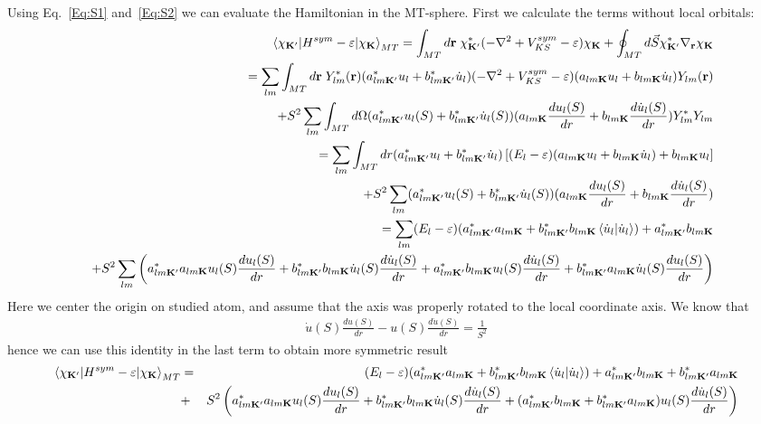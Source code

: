 \documentclass[aps,prb,floatfix,epsfig,singlecolumn,showpacs,preprintnumbers]{revtex4}
\renewcommand{\vr}{{\mathbf{r}}}
\newcommand{\vK}{{\mathbf{K}}}
\begin{document}
Using Eq.~\ref{Eq:S1} and~\ref{Eq:S2} we can evaluate the Hamiltonian
in the MT-sphere. First we calculate the terms without local orbitals:
\begin{eqnarray}
&&\braket{\chi_{\vK'}|H^{sym}-\varepsilon|\chi_\vK}_{MT}=\int_{MT}d\vr\; \chi^*_{\vK'}(-\nabla^2+V_{KS}^{sym}-\varepsilon)\chi_{\vK}+\oint_{MT} d\vec{S}
\chi^*_{\vK'}\nabla_\vr\chi_{\vK}\\
&&=
\sum_{lm}\int_{MT}d\vr\; Y_{lm}^*(\vr) (a_{lm\vK'}^* u_l+b_{lm\vK'}^* \dot{u}_l)
(-\nabla^2+V_{KS}^{sym}-\varepsilon)  (a_{lm\vK} u_l+b_{lm\vK} \dot{u}_l)Y_{lm}(\vr)
\nonumber\\
&&+S^2\sum_{lm}\int_{MT} d\Omega (a_{lm\vK'}^* u_l(S)+b_{lm\vK'}^*  \dot{u}_l(S))  (a_{lm\vK} \frac{d u_l(S)}{dr}+b_{lm\vK}  \frac{d\dot{u}_l(S)}{dr}) Y_{lm}^*  Y_{lm}
\nonumber\\
&&=
\sum_{lm}\int_{MT} dr (a_{lm\vK'}^* u_l+b_{lm\vK'}^* \dot{u}_l)  \left[(E_l-\varepsilon)(a_{lm\vK} u_l+b_{lm\vK} \dot{u}_l) +b_{lm\vK}  u_l \right]
\nonumber\\
&&+S^2\sum_{lm} (a_{lm\vK'}^* u_l(S)+b_{lm\vK'}^*  \dot{u}_l(S))  (a_{lm\vK} \frac{d u_l(S)}{dr}+b_{lm\vK}  \frac{d\dot{u}_l(S)}{dr})
\nonumber\\
&&=\sum_{lm}(E_l-\varepsilon) (a_{lm\vK'}^* a_{lm\vK} +b_{lm\vK'}^* b_{lm\vK}  \braket{\dot{u}_l|\dot{u}_l})+a_{lm\vK'}^* b_{lm\vK} 
\\
&&+S^2 \sum_{lm}\left(
a_{lm\vK'}^*a_{lm\vK} u_l(S) \frac{d u_l(S)}{dr}+
b_{lm\vK'}^* b_{lm\vK}  \dot{u}_l(S) \frac{d\dot{u}_l(S)}{dr}+
a_{lm\vK'}^* b_{lm\vK}  u_l(S) \frac{d\dot{u}_l(S)}{dr}+
b_{lm\vK'}^*  a_{lm\vK} \dot{u}_l(S) \frac{d u_l(S)}{dr}\right)\nonumber
\end{eqnarray}
Here we center the origin on studied atom, and assume that the axis
was properly rotated to the local coordinate axis.
 We know that
\begin{eqnarray}
\dot{u}(S)\frac{du(S)}{dr}-u(S) \frac{d\dot{u}(S)}{dr}=\frac{1}{S^2}
\end{eqnarray}
hence we can use this identity in the last term to obtain more
symmetric result
\begin{eqnarray}
\braket{\chi_{\vK'}|H^{sym}-\varepsilon|\chi_\vK}_{MT}&=&(E_l-\varepsilon) (a_{lm\vK'}^* a_{lm\vK} +b_{lm\vK'}^* b_{lm\vK}  \braket{\dot{u}_l|\dot{u}_l})+a_{lm\vK'}^* b_{lm\vK} +b_{lm\vK'}^*  a_{lm\vK}
\\
&+&S^2 \left(
a_{lm\vK'}^*a_{lm\vK} u_l(S) \frac{d u_l(S)}{dr}+
b_{lm\vK'}^* b_{lm\vK}  \dot{u}_l(S) \frac{d\dot{u}_l(S)}{dr}+
(a_{lm\vK'}^* b_{lm\vK}+b_{lm\vK'}^*  a_{lm\vK})  u_l(S) \frac{d\dot{u}_l(S)}{dr}
\right)\nonumber
\end{eqnarray}
\end{document}

